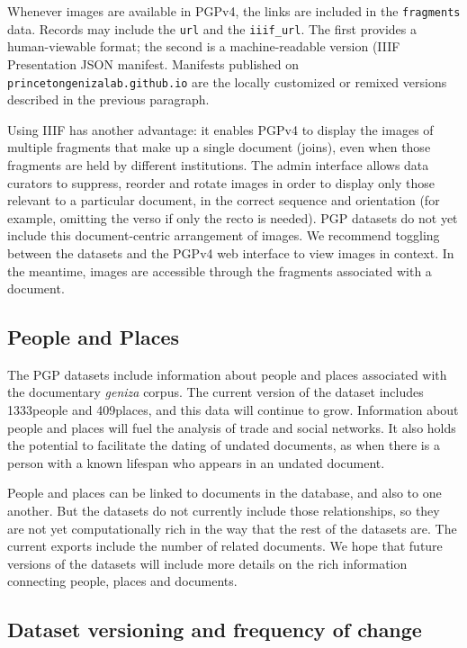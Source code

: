 \documentclass{article}
\def\totalPeopleRecords{1333}
\def\totalPlaceRecords{409}
\begin{document}
Whenever images are available in PGPv4, the links are included in the \texttt{fragments} data. Records may include the \texttt{url} and the \texttt{iiif\_url}. The first provides a human-viewable format; the second is a machine-readable version (IIIF Presentation JSON manifest. Manifests published on
\texttt{princetongenizalab.github.io} are the locally customized or remixed versions described in the previous paragraph.

Using IIIF has another advantage: it enables PGPv4 to display the images of multiple fragments that make up a single document (joins), even when those fragments are held by different institutions. The admin interface allows data curators to suppress, reorder and rotate images in order to display only those relevant to a particular document, in the correct sequence and orientation (for example, omitting the verso if only the recto is needed). PGP datasets do not yet include this document-centric arrangement of images. We recommend toggling between the datasets and the PGPv4 web interface to view images in context. In the meantime, images are accessible through the fragments associated with a document.

\subsection{People and Places}

The PGP datasets include information about people and places associated with the documentary \textit{geniza }corpus. The current version of the dataset includes \totalPeopleRecords\space people and \totalPlaceRecords\space places, and this data will continue to grow. Information about people and places will fuel the analysis of trade and social networks. It also holds the potential to facilitate the dating of undated documents, as when there is a person with a known lifespan who appears in an undated document. 

People and places can be linked to documents in the database, and also to one another. But the datasets do not currently include those relationships, so they are not yet computationally rich in the way that the rest of the datasets are. The current exports include the number of related documents. We hope that future versions of the datasets will include more details on the rich information connecting people, places and documents.

\subsection{Dataset versioning and frequency of change}
\end{document}
